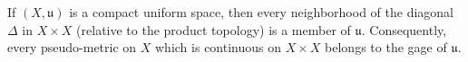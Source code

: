 If $(X, \mathfrak{u})$ is a compact uniform space, then every neighborhood of the diagonal $\Delta$ in $X \times X$ (relative to the product topology) is a member of $\mathfrak{u}$. Consequently, every pseudo-metric on $X$ which is continuous on $X \times X$ belongs to the gage of $\mathfrak{u}$.
